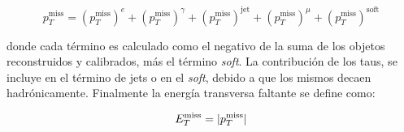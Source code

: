 \begin{equation}
p_{T}^{\text{miss}}=\left(p_{T}^{\text{miss}}\right)^{e} + \left(p_{T}^{\text{miss}}\right)^{\gamma} + \left(p_{T}^{\text{miss}}\right)^{\text{jet}} +\left(p_{T}^{\text{miss}}\right)^{\mu} + \left(p_{T}^{\text{miss}}\right)^{\text{soft}}
\end{equation}

\noindent
donde cada término es calculado como el negativo de la suma de los objetos reconstruidos y calibrados, más el término \textit{soft}. La contribución de los taus, se incluye en el término de jets o en el \textit{soft}, debido a que los mismos decaen hadrónicamente. Finalmente la energía transversa faltante se define como:

\begin{equation}
E_{T}^{\text{miss}}=|p_{T}^{\text{miss}}|
\end{equation}



\clearpage